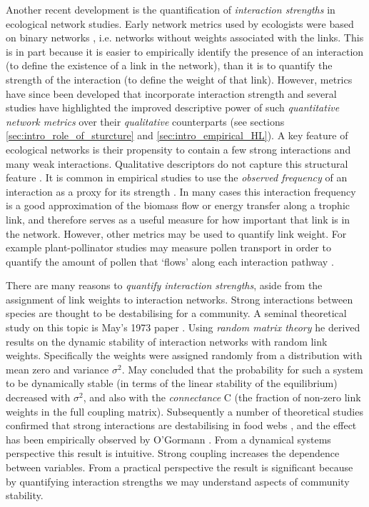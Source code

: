 Another recent development is the quantification of \emph{interaction strengths} in ecological network studies. Early network metrics used by ecologists were based on binary networks \cite{bersier2002quantitative}, i.e. networks without weights associated with the links. This is in part because it is easier to empirically identify the presence of an interaction (to define the existence of a link in the network), than it is to quantify the strength of the interaction (to define the weight of that link). However, metrics have since been developed that incorporate interaction strength \cite{bersier2002quantitative,bluthgen2008interaction,bluthgen2006measuring} and several studies have highlighted the improved descriptive power of such \emph{quantitative network metrics} over their \emph{qualitative} counterparts (see sections \ref{sec:intro_role_of_sturcture} and \ref{sec:intro_empirical_HL}). A key feature of ecological networks is their propensity to contain a few strong interactions and many weak interactions. Qualitative descriptors do not capture this structural feature \cite{bersier2002quantitative}. It is common in empirical studies to use the \emph{observed frequency} of an interaction as a proxy for its strength \cite{bluthgen2008interaction,berlow2004interaction}. In many cases this interaction frequency is a good approximation of the biomass flow or energy transfer along a trophic link, and therefore serves as a useful measure for how important that link is in the network. However, other metrics may be used to quantify link weight. For example plant-pollinator studies may measure pollen transport in order to quantify the amount of pollen that `flows' along each interaction pathway \cite{devoto2011night}.  

There are many reasons to \emph{quantify interaction strengths}, aside from the assignment of link weights to interaction networks. Strong interactions between species are thought to be destabilising for a community. A seminal theoretical study on this topic is May's 1973 paper \cite{may1972will}. Using \emph{random matrix theory} he derived results on the dynamic stability of interaction networks with random link weights. Specifically the weights were assigned randomly from a distribution with mean zero and variance $\sigma^2$. May concluded that the probability for such a system to be dynamically stable (in terms of the linear stability of the equilibrium) decreased with $\sigma^2$, and also with the \emph{connectance} C (the fraction of non-zero link weights in the full coupling matrix). Subsequently a number of theoretical studies confirmed that strong interactions are destabilising in food webs \cite{mccann1998weak,gross2009generalized}, and the effect has been empirically observed by O'Gormann \cite{o2009perturbations}.  From a dynamical systems perspective this result is intuitive. Strong coupling increases the dependence between variables. From a practical perspective the result is significant because by quantifying interaction strengths we may understand aspects of community stability. 

